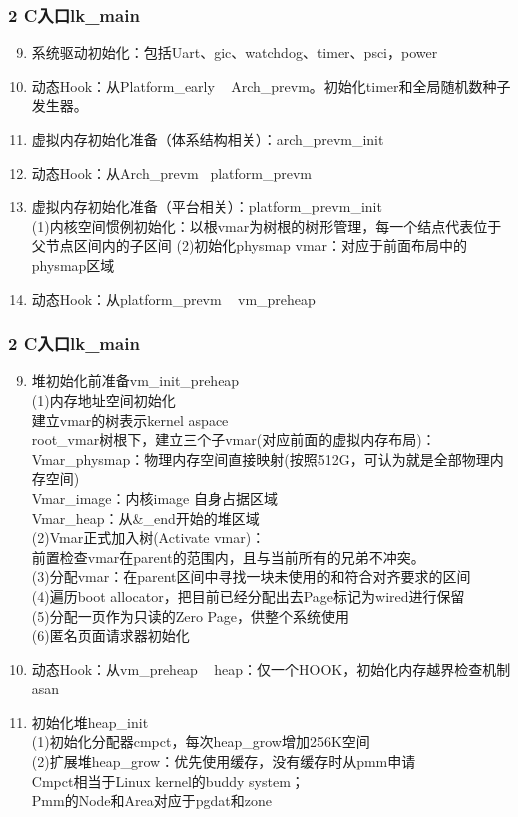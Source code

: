 \documentclass[
8pt, %
]{beamer}
\begin{document}
	\begin{frame}
		\frametitle{2 C入口lk\_main}
		\begin{enumerate}\setcounter{enumi}{8}
			\item 系统驱动初始化：包括Uart、gic、watchdog、timer、psci，power
			\item 动态Hook：从Platform\_early ~ Arch\_prevm。初始化timer和全局随机数种子发生器。
			\item 虚拟内存初始化准备（体系结构相关）：arch\_prevm\_init
			\item 动态Hook：从Arch\_prevm ~platform\_prevm
			\item 虚拟内存初始化准备（平台相关）：platform\_prevm\_init\\
			(1)内核空间惯例初始化：以根vmar为树根的树形管理，每一个结点代表位于父节点区间内的子区间
			(2)初始化physmap vmar：对应于前面布局中的physmap区域
			\item 动态Hook：从platform\_prevm ~ vm\_preheap
		\end{enumerate}
	\end{frame}

	\begin{frame}
		\frametitle{2 C入口lk\_main}
		\begin{enumerate}\setcounter{enumi}{8}
			\item 堆初始化前准备vm\_init\_preheap\\
			(1)内存地址空间初始化\\
			建立vmar的树表示kernel aspace\\
			root\_vmar树根下，建立三个子vmar(对应前面的虚拟内存布局)：\\
			Vmar\_physmap：物理内存空间直接映射(按照512G，可认为就是全部物理内存空间)\\
			Vmar\_image：内核image 自身占据区域\\
			Vmar\_heap：从\&\_end开始的堆区域\\
			(2)Vmar正式加入树(Activate vmar)：\\
			前置检查vmar在parent的范围内，且与当前所有的兄弟不冲突。\\
			(3)分配vmar：在parent区间中寻找一块未使用的和符合对齐要求的区间\\
			(4)遍历boot allocator，把目前已经分配出去Page标记为wired进行保留\\
			(5)分配一页作为只读的Zero Page，供整个系统使用\\
			(6)匿名页面请求器初始化
			\item 动态Hook：从vm\_preheap ~ heap：仅一个HOOK，初始化内存越界检查机制asan
			\item 初始化堆heap\_init\\
			(1)初始化分配器cmpct，每次heap\_grow增加256K空间\\
			(2)扩展堆heap\_grow：优先使用缓存，没有缓存时从pmm申请\\
			Cmpct相当于Linux kernel的buddy system；\\
            Pmm的Node和Area对应于pgdat和zone
		\end{enumerate}
	\end{frame}
\end{document}
